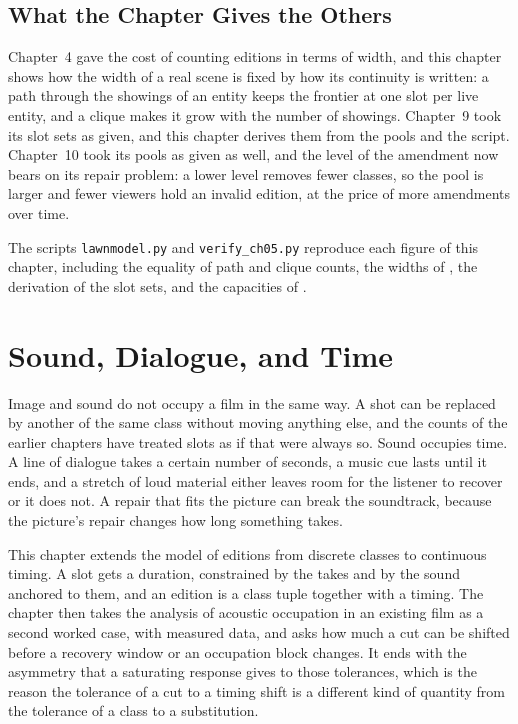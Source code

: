 \documentclass[11pt,twoside,openright]{book}
\theoremstyle{plain}
\theoremstyle{definition}
\theoremstyle{remark}
\begin{document}
\section{What the Chapter Gives the Others}\label{sec:gives}

Chapter~4 gave the cost of counting editions in terms of width, and this chapter shows how the width of a real scene is fixed by how its continuity is written: a path through the showings of an entity keeps the frontier at one slot per live entity, and a clique makes it grow with the number of showings. Chapter~9 took its slot sets as given, and this chapter derives them from the pools and the script. Chapter~10 took its pools as given as well, and the level of the amendment now bears on its repair problem: a lower level removes fewer classes, so the pool is larger and fewer viewers hold an invalid edition, at the price of more amendments over time.

The scripts \texttt{lawnmodel.py} and \texttt{verify\_ch05.py} reproduce each figure of this chapter, including the equality of path and clique counts, the widths of , the derivation of the slot sets, and the capacities of .

\chapter{Sound, Dialogue, and Time}
\label{ch:sound}

Image and sound do not occupy a film in the same way. A shot can be replaced by another of the same class without moving anything else, and the counts of the earlier chapters have treated slots as if that were always so. Sound occupies time. A line of dialogue takes a certain number of seconds, a music cue lasts until it ends, and a stretch of loud material either leaves room for the listener to recover or it does not. A repair that fits the picture can break the soundtrack, because the picture's repair changes how long something takes.

This chapter extends the model of editions from discrete classes to continuous timing. A slot gets a duration, constrained by the takes and by the sound anchored to them, and an edition is a class tuple together with a timing. The chapter then takes the analysis of acoustic occupation in an existing film as a second worked case, with measured data, and asks how much a cut can be shifted before a recovery window or an occupation block changes. It ends with the asymmetry that a saturating response gives to those tolerances, which is the reason the tolerance of a cut to a timing shift is a different kind of quantity from the tolerance of a class to a substitution.
\end{document}
